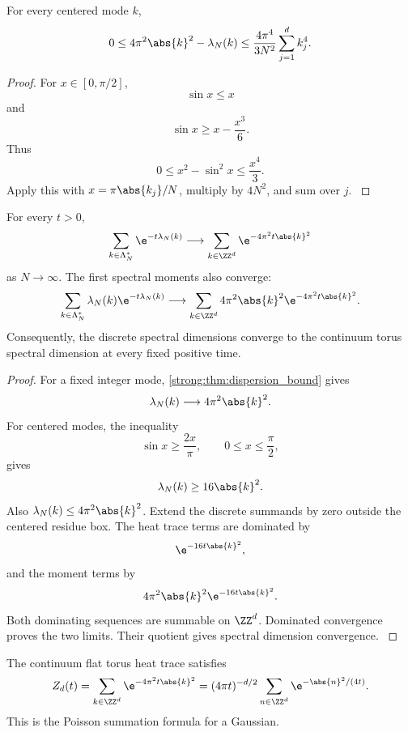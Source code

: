 \begin{theorem}\label{strong:theorem:039}\label{strong:thm:dispersion_bound}
For every centered mode \(k\),
\[
0
\leq
4\pi^2\abs{k}^2-\lambda_N(k)
\leq
\frac{4\pi^4}{3N^2}
\sum_{j=1}^{d}k_j^4.
\]
\end{theorem}

\begin{proof}\label{strong:proof:064}
For \(x\in[0,\pi/2]\),
\[
\sin x\leq x
\]
and
\[
\sin x\geq x-\frac{x^3}{6}.
\]
Thus
\[
0\leq x^2-\sin^2x\leq\frac{x^4}{3}.
\]
Apply this with \(x=\pi\abs{k_j}/N\), multiply by \(4N^2\), and sum over \(j\).
\label{strong:proof:064:end}\end{proof}

\begin{theorem}\label{strong:theorem:040}\label{strong:thm:heat_trace_convergence}
For every \(t>0\),
\[
\sum_{k\in\Lambda_N^*}
\e^{-t\lambda_N(k)}
\longrightarrow
\sum_{k\in\ZZ^d}
\e^{-4\pi^2t\abs{k}^2}
\]
as \(N\to\infty\). The first spectral moments also converge:
\[
\sum_{k\in\Lambda_N^*}
\lambda_N(k)\e^{-t\lambda_N(k)}
\longrightarrow
\sum_{k\in\ZZ^d}
4\pi^2\abs{k}^2\e^{-4\pi^2t\abs{k}^2}.
\]
Consequently, the discrete spectral dimensions converge to the continuum torus spectral dimension at every fixed positive time.
\end{theorem}

\begin{proof}\label{strong:proof:065}
For a fixed integer mode, \cref{strong:thm:dispersion_bound} gives
\[
\lambda_N(k)\longrightarrow4\pi^2\abs{k}^2.
\]
For centered modes, the inequality
\[
\sin x\geq\frac{2x}{\pi},
\qquad
0\leq x\leq\frac\pi2,
\]
gives
\[
\lambda_N(k)\geq16\abs{k}^2.
\]
Also \(\lambda_N(k)\leq4\pi^2\abs{k}^2\). Extend the discrete summands by zero outside the centered residue box. The heat trace terms are dominated by
\[
\e^{-16t\abs{k}^2},
\]
and the moment terms by
\[
4\pi^2\abs{k}^2\e^{-16t\abs{k}^2}.
\]
Both dominating sequences are summable on \(\ZZ^d\). Dominated convergence proves the two limits. Their quotient gives spectral dimension convergence.
\label{strong:proof:065:end}\end{proof}

\begin{standardfact}\label{strong:standardfact:004}\label{strong:fact:theta_transform}
The continuum flat torus heat trace satisfies
\[
Z_d(t)
=
\sum_{k\in\ZZ^d}\e^{-4\pi^2t\abs{k}^2}
=
(4\pi t)^{-d/2}
\sum_{n\in\ZZ^d}\e^{-\abs{n}^2/(4t)}.
\]
This is the Poisson summation formula for a Gaussian.
\end{standardfact}

